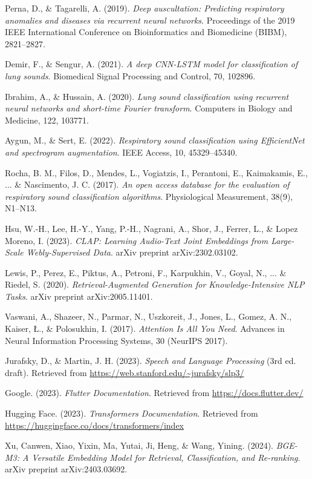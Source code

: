 \begin{thebibliography}{10}

Perna, D., \& Tagarelli, A. (2019). 
\textit{Deep auscultation: Predicting respiratory anomalies and diseases via recurrent neural networks}. 
Proceedings of the 2019 IEEE International Conference on Bioinformatics and Biomedicine (BIBM), 2821–2827.

Demir, F., \& Sengur, A. (2021).
\textit{A deep CNN-LSTM model for classification of lung sounds}.
Biomedical Signal Processing and Control, 70, 102896.

Ibrahim, A., \& Hussain, A. (2020).
\textit{Lung sound classification using recurrent neural networks and short-time Fourier transform}.
Computers in Biology and Medicine, 122, 103771.

Aygun, M., \& Sert, E. (2022).
\textit{Respiratory sound classification using EfficientNet and spectrogram augmentation}.
IEEE Access, 10, 45329–45340.

Rocha, B. M., Filos, D., Mendes, L., Vogiatzis, I., Perantoni, E., Kaimakamis, E., ... \& Nascimento, J. C. (2017).
\textit{An open access database for the evaluation of respiratory sound classification algorithms}.
Physiological Measurement, 38(9), N1–N13.

Hsu, W.-H., Lee, H.-Y., Yang, P.-H., Nagrani, A., Shor, J., Ferrer, L., \& Lopez Moreno, I. (2023). 
\textit{CLAP: Learning Audio-Text Joint Embeddings from Large-Scale Webly-Supervised Data}. 
arXiv preprint arXiv:2302.03102.

Lewis, P., Perez, E., Piktus, A., Petroni, F., Karpukhin, V., Goyal, N., ... \& Riedel, S. (2020). 
\textit{Retrieval-Augmented Generation for Knowledge-Intensive NLP Tasks}. 
arXiv preprint arXiv:2005.11401.

Vaswani, A., Shazeer, N., Parmar, N., Uszkoreit, J., Jones, L., Gomez, A. N., Kaiser, Ł., \& Polosukhin, I. (2017).  
\textit{Attention Is All You Need}.  
Advances in Neural Information Processing Systems, 30 (NeurIPS 2017).

Jurafsky, D., \& Martin, J. H. (2023). 
\textit{Speech and Language Processing} (3rd ed. draft). 
Retrieved from \url{https://web.stanford.edu/~jurafsky/slp3/}

Google. (2023). 
\textit{Flutter Documentation}. 
Retrieved from \url{https://docs.flutter.dev/}

Hugging Face. (2023). 
\textit{Transformers Documentation}. 
Retrieved from \url{https://huggingface.co/docs/transformers/index}

Xu, Canwen, Xiao, Yixin, Ma, Yutai, Ji, Heng, \& Wang, Yining. (2024).  
\textit{BGE-M3: A Versatile Embedding Model for Retrieval, Classification, and Re-ranking}.  
arXiv preprint arXiv:2403.03692.


\end{thebibliography}
